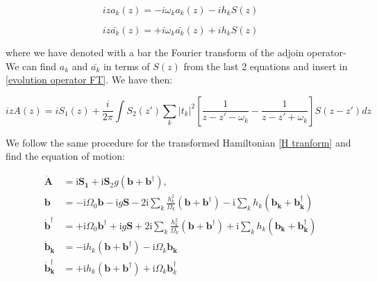 \documentclass[%
preprint,
onecolumn,
notitlepag,
 amsmath,amssymb,
 aps,
 pra,
]{revtex4-2}
\begin{document}
\begin{equation}
    iza_k(z) = -i\omega_k a_k(z) - ih_k S(z)
\end{equation}


\begin{equation}
    iz\bar{ a_k} (z) = +i\omega_k \bar{ a_k}(z) + ih_k S(z)
\end{equation}

where we have denoted with a bar the Fourier transform of the adjoin operator- We can find $a_k$ and $\bar{ a_k}$ in terms of $S(z)$ from the last 2 equations  and insert in \ref{evolution operator FT}. We have then: 


\begin{equation}
izA(z)= i S_1 (z) + \frac{i}{2\pi} \int S_2(z') \sum_k |t_k|^2 \left[ \frac{1}{z-z'-\omega_k} - \frac{1}{z-z'+\omega_k} \right]  S(z-z') dz
\label{evolution operator FT final}
\end{equation}

We follow the same procedure for the transformed Hamiltonian \eqref{H tranform} and find the equation of motion:  



\begin{equation}
\begin{aligned}
\boldsymbol{ \dot{A} }&=\mathrm{i} \boldsymbol{ S_{1}}+\mathrm{i} \boldsymbol{S}_{2} g\left(\boldsymbol{b}+\boldsymbol{b}^{\dagger}\right), \\
\boldsymbol{b} &=-\mathrm{i} \Omega_{0} \boldsymbol{b}-\mathrm{i} g \boldsymbol{S}-2 \mathrm{i} \sum_{k} \frac{h_{k}^{2}}{\Omega_{k}}\left(\boldsymbol{b}+\boldsymbol{b}^{\dagger}\right)-\mathrm{i} \sum_{k} h_{k}\left(\boldsymbol{b}_{\boldsymbol{k}}+\boldsymbol{b}_{\boldsymbol{k}}^{\dagger}\right) \\
\dot{\boldsymbol{b}}^{\dagger} &=+\mathrm{i} \Omega_{0} \boldsymbol{b}^{\dagger}+\mathrm{i} g \boldsymbol{S}+2 \mathrm{i} \sum_{k} \frac{h_{k}^{2}}{\Omega_{k}}\left(\boldsymbol{b}+\boldsymbol{b}^{\dagger}\right)+\mathrm{i} \sum_{k} h_{k}\left(\boldsymbol{b}_{\boldsymbol{k}}+\boldsymbol{b}_{\boldsymbol{k}}^{\dagger}\right) \\
\dot{\boldsymbol{b}}_{\boldsymbol{k}} &=-\mathrm{i} h_{k}\left(\boldsymbol{b}+\boldsymbol{b}^{\dagger}\right)-\mathrm{i} \Omega_{k} \boldsymbol{b}_{\boldsymbol{k}} \\
\dot{\boldsymbol{b}}_{\boldsymbol{k}}^{\dagger} &=+\mathrm{i} h_{k}\left(\boldsymbol{b}+\boldsymbol{b}^{\dagger}\right)+\mathrm{i} \Omega_{k} \boldsymbol{b}_{k}^{\dagger}
\end{aligned}
\end{equation}
\end{document}
